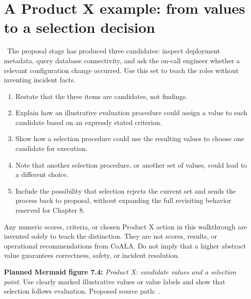 \section{A Product X example: from values to a selection decision}
\BookExampleLabel\ The proposal stage has produced three candidates: inspect deployment metadata, query database connectivity, and ask the on-call engineer whether a relevant configuration change occurred. Use this set to teach the roles without inventing incident facts.
\begin{enumerate}
  \item Restate that the three items are candidates, not findings.
  \item Explain how an illustrative evaluation procedure could assign a value to each candidate based on an expressly stated criterion.
  \item Show how a selection procedure could use the resulting values to choose one candidate for execution.
  \item Note that another selection procedure, or another set of values, could lead to a different choice.
  \item Include the possibility that selection rejects the current set and sends the process back to proposal, without expanding the full revisiting behavior reserved for Chapter 8.
\end{enumerate}
\begin{warningbox}
Any numeric scores, criteria, or chosen Product X action in this walkthrough are invented solely to teach the distinction. They are not scores, results, or operational recommendations from CoALA. Do not imply that a higher abstract value guarantees correctness, safety, or incident resolution.
\end{warningbox}
\textbf{Planned Mermaid figure 7.4:} \emph{Product X: candidate values and a selection point}. Use clearly marked illustrative values or value labels and show that selection follows evaluation. Proposed source path: .

